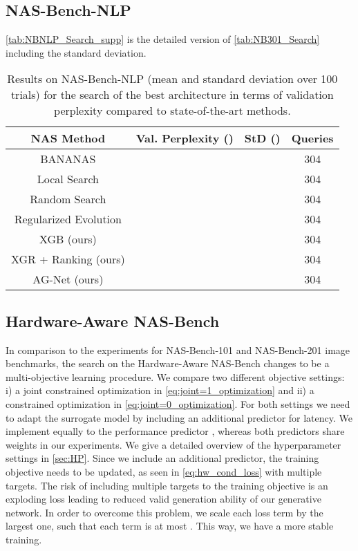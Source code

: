 \documentclass[runningheads]{llncs}
\begin{document}
\subsection{NAS-Bench-NLP}
\autoref{tab:NBNLP_Search_supp} is the detailed version of \autoref{tab:NB301_Search} including the standard deviation.
\begin{table}[t]
	\caption{Results on NAS-Bench-NLP (mean and standard deviation over 100 trials) for the search of the best architecture in terms of validation perplexity compared to state-of-the-art methods.}
	\label{tab:NBNLP_Search_supp}
	\scriptsize
	\begin{center}
		\begin{tabular}{c||c|c || c}
			\toprule
			\textbf{NAS Method}  & \textbf{Val. Perplexity} () & \textbf{StD} () & \textbf{Queries} \\
			\midrule
			BANANAS\textsuperscript{\textdagger} \cite{2021BANANAS} &   &   & 304 \\
			Local Search\textsuperscript{\textdagger} \cite{2020LocalSearchNAS} &  &  & 304\\
			Random Search\textsuperscript{\textdagger}\cite{2019RS}  &  &  & 304 \\
			Regularized Evolution\textsuperscript{{\textdagger}}\cite{2019EvolutionaryNAS}  &  &  & 304 \\
			\midrule
			XGB (ours) &  &  & 304 \\
			XGR + Ranking (ours) &  & & 304 \\
			\midrule
			AG-Net (ours)  &  &  & 304
			\\
			\bottomrule
		\end{tabular}
	\end{center}
\end{table}

\subsection{Hardware-Aware NAS-Bench}
In comparison to the experiments for NAS-Bench-101 \cite{2019NB101} and NAS-Bench-201 \cite{2020NB201} image benchmarks, the search on the Hardware-Aware NAS-Bench \cite{2021HWNNB} changes to be a multi-objective learning procedure.
We compare two different objective settings: i) a joint constrained optimization in \autoref{eq:joint=1_optimization}
and ii) a constrained optimization in \autoref{eq:joint=0_optimization}.
For both settings we need to adapt the surrogate model by including an additional predictor  for latency.
We implement  equally to the performance predictor , whereas both predictors share weights in our experiments.
We give a detailed overview of the hyperparameter settings in \autoref{sec:HP}.
Since we include an additional predictor, the training objective needs to be updated, as seen in \autoref{eq:hw_cond_loss} with multiple targets.
The risk of including multiple targets to the training objective is an exploding loss leading to reduced valid generation ability of our generative network.
In order to overcome this problem, we scale each loss term by the largest one, such that each term is at most .
This way, we have a more stable training.
\end{document}
